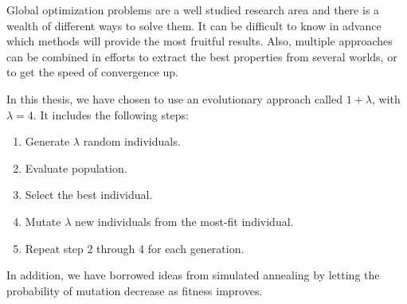 Global optimization problems are a well studied research area and there is a
wealth of different ways to solve them. It can be difficult to know in advance
which methods will provide the most fruitful results. Also, multiple approaches
can be combined in efforts to extract the best properties from several worlds,
or to get the speed of convergence up.

In this thesis, we have chosen to use an evolutionary approach called $1 +
\lambda$, with $\lambda = 4$. It includes the following steps:

\begin{enumerate}
    \item Generate $\lambda$ random individuals.
    \item Evaluate population.
    \item Select the best individual.
    \item Mutate $\lambda$ new individuals from the most-fit individual.
    \item Repeat step 2 through 4 for each generation.
\end{enumerate}

In addition, we have borrowed ideas from simulated annealing by letting the
probability of mutation decrease as fitness improves.
